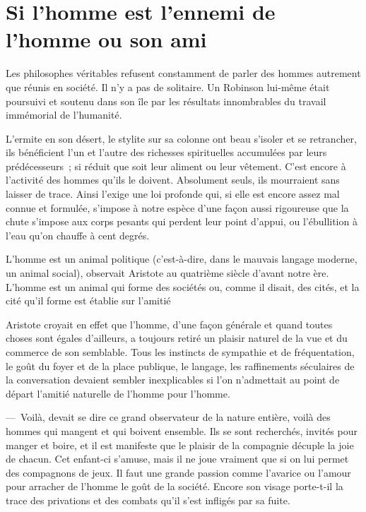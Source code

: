 \documentclass[french,twoside]{book} %
\begin{document}
\section[{Si l’homme est l’ennemi de l’homme ou son ami}]{Si l’homme est l’ennemi de l’homme ou son ami}
\noindent Les philosophes véritables refusent constamment de parler des hommes autrement que réunis en société. Il n’y a pas de solitaire. Un Robinson lui-même était poursuivi et soutenu dans son île par les résultats innombrables du travail immémorial de l’humanité.\par
L’ermite en son désert, le stylite sur sa colonne ont beau s’isoler et se retrancher, ils bénéficient l’un et l’autre des richesses spirituelles accumulées par leurs prédécesseurs ; si réduit que soit leur aliment ou leur vêtement. C’est encore à l’activité des hommes qu’ils le doivent. Absolument seuls, ils mourraient sans laisser de trace. Ainsi l’exige une loi profonde qui, si elle est encore assez mal connue et formulée, s’impose à notre espèce d’une façon aussi rigoureuse que la chute s’impose aux corps pesants qui perdent leur point d’appui, ou l’ébullition à l’eau qu’on chauffe à cent degrés.\par
L’homme est un animal politique (c’est-à-dire, dans le mauvais langage moderne, un animal social), observait Aristote au quatrième siècle d’avant notre ère. L’homme est un animal qui forme des sociétés ou, comme il disait, des cités, et la cité qu’il forme est établie sur l’amitié\par
Aristote croyait en effet que l’homme, d’une façon générale et quand toutes choses sont égales d’ailleurs, a toujours retiré un plaisir naturel de la vue et du commerce de son semblable. Tous les instincts de sympathie et de fréquentation, le goût du foyer et de la place publique, le langage, les raffinements séculaires de la conversation devaient sembler inexplicables si l’on n’admettait au point de départ l’amitié naturelle de l’homme pour l’homme.\par
— Voilà, devait se dire ce grand observateur de la nature entière, voilà des hommes qui mangent et qui boivent ensemble. Ils se sont recherchés, invités pour manger et boire, et il est manifeste que le plaisir de la compagnie décuple la joie de chacun. Cet enfant-ci s’amuse, mais il ne joue vraiment que si on lui permet des compagnons de jeux. Il faut une grande passion comme l’avarice ou l’amour pour arracher de l’homme le goût de la société. Encore son visage porte-t-il la trace des privations et des combats qu’il s’est infligés par sa fuite.\par
\end{document}
